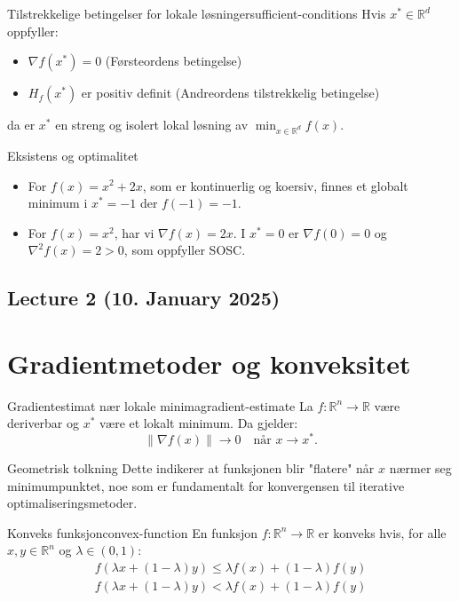 \begin{theorem}{Tilstrekkelige betingelser for lokale løsninger}{sufficient-conditions}
  Hvis $x^* \in \mathbb{R}^d$ oppfyller:
  \begin{itemize}
    \item $\nabla f(x^*) = 0$ (Førsteordens betingelse)
    \item $H_f(x^*)$ er positiv definit (Andreordens tilstrekkelig betingelse)
  \end{itemize}
  da er $x^*$ en streng og isolert lokal løsning av $\min_{x \in \mathbb{R}^d} f(x)$.
\end{theorem}\label{thm:sufficient-conditions}

\begin{example}{Eksistens og optimalitet}{}
  \begin{itemize}
    \item For \( f(x) = x^2 + 2x \), som er kontinuerlig og koersiv, finnes et globalt minimum i \( x^* = -1 \) der \( f(-1) = -1 \).
    \item For \( f(x) = x^2 \), har vi \( \nabla f(x) = 2x \). I \( x^* = 0 \) er \( \nabla f(0) = 0 \) og \( \nabla^2 f(x) = 2 > 0 \), som oppfyller SOSC.
  \end{itemize}
\end{example}

\subsection{Lecture 2 (10. January 2025)}

\section*{Gradientmetoder og konveksitet}

\begin{theorem}{Gradientestimat nær lokale minima}{gradient-estimate}
  La $f: \mathbb{R}^n \to \mathbb{R}$ være deriverbar og $x^*$ være et lokalt minimum. Da gjelder:
  \[
    \|\nabla f(x)\| \to 0 \quad \text{når } x \to x^*.
  \]
\end{theorem}

\begin{remark}{Geometrisk tolkning}
  Dette indikerer at funksjonen blir "flatere" når $x$ nærmer seg minimumpunktet, noe som er fundamentalt for konvergensen til iterative optimaliseringsmetoder.
\end{remark}

\begin{definition}{Konveks funksjon}{convex-function}
  En funksjon $f: \mathbb{R}^n \to \mathbb{R}$ er konveks hvis, for alle $x, y \in \mathbb{R}^n$ og $\lambda \in (0,1)$:
  \begin{align*}
    f(\lambda x + (1 - \lambda)y) \leq \lambda f(x) + (1 - \lambda)f(y) \tag{Konveks} \\
    f(\lambda x + (1 - \lambda)y) < \lambda f(x) + (1 - \lambda)f(y) \tag{Strengt konveks}
  \end{align*}

\end{definition}


